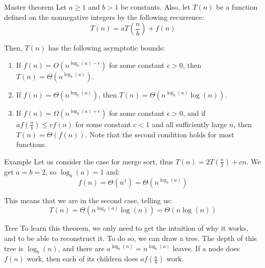 \documentclass[a4paper]{article}
\begin{document}
\begin{parag}{Master theorem}
    Let $a \geq 1$ and $b > 1$ be constants. Also, let $T\left(n\right)$ be a function defined on the nonnegative integers by the following recurrence: 
    \[T\left(n\right) = aT\left(\frac{n}{b}\right) + f\left(n\right)\]
    
    Then, $T\left(n\right)$ has the following asymptotic bounds:
    \begin{enumerate}
        \item If $f\left(n\right) = O\left(n^{\log_b\left(a\right) - \epsilon}\right)$ for some constant $\epsilon > 0$, then $T\left(n\right) = \Theta\left(n^{\log_b\left(a\right)}\right)$.
        \item If $f\left(n\right) = \Theta\left(n^{\log_b\left(a\right)}\right)$, then $T\left(n\right) = \Theta\left(n^{\log_b\left(a\right)} \log\left(n\right)\right)$.
        \item If $f\left(n\right) = \Omega\left(n^{\log_b\left(a\right) + \epsilon}\right)$ for some constant $\epsilon > 0$, and if $a f\left(\frac{n}{b}\right) \leq c f\left(n\right)$ for some constant $c < 1$ and all sufficiently large $n$, then $T\left(n\right)= \Theta\left(f\left(n\right)\right)$. Note that the second condition holds for most functions.
    \end{enumerate}

    \begin{subparag}{Example}
        Let us consider the case for merge sort, thus $T\left(n\right) = 2T\left(\frac{n}{2}\right) + cn$. We get $a = b = 2$, so $\log_b\left(a\right) = 1$ and: 
        \[f\left(n\right) = \Theta\left(n^1\right) = \Theta\left(n^{\log_b\left(a\right)}\right)\]
        
        This means that we are in the second case, telling us: 
        \[T\left(n\right) = \Theta\left(n^{\log_b\left(a\right)} \log\left(n\right)\right) = \Theta\left(n \log\left(n\right)\right)\]
    \end{subparag}
    
    \begin{subparag}{Tree}
        To learn this theorem, we only need to get the intuition of why it works, and to be able to reconstruct it. To do so, we can draw a tree. The depth of this tree is $\log_b\left(n\right)$, and there are $a^{\log_b\left(n\right)} = n^{\log_b\left(a\right)}$ leaves. If a node does $f\left(n\right)$ work, then each of its children does $af\left(\frac{n}{b}\right)$ work.


\end{subparag}
\end{parag}
\end{document}
